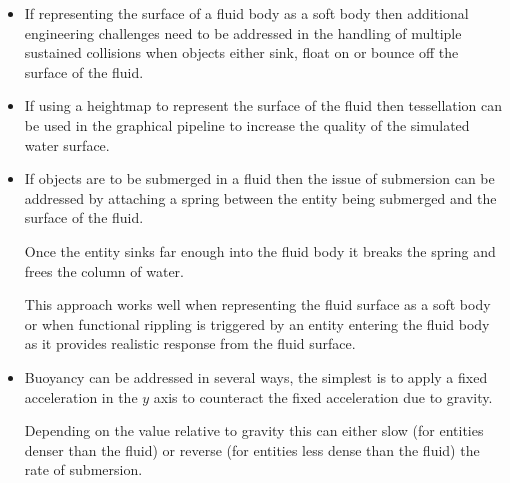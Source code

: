 \documentclass[a4paper]{article}
\begin{document}
\begin{itemize}
  \item
    If representing the surface of a fluid body as a soft body then additional
    engineering challenges need to be addressed in the handling of multiple
    sustained collisions when objects either sink, float on or bounce off the
    surface of the fluid.

  \item
    If using a heightmap to represent the surface of the fluid then tessellation
    can be used in the graphical pipeline to increase the quality of the
    simulated water surface.

  \item
    If objects are to be submerged in a fluid then the issue of submersion can
    be addressed by attaching a spring between the entity being submerged and
    the surface of the fluid.

    Once the entity sinks far enough into the fluid body it breaks the spring
    and frees the column of water.

    This approach works well when representing the fluid surface as a soft body
    or when functional rippling is triggered by an entity entering the fluid
    body as it provides realistic response from the fluid surface.

  \item
    Buoyancy can be addressed in several ways, the simplest is to apply a fixed
    acceleration in the $y$ axis to counteract the fixed acceleration due to
    gravity.

    Depending on the value relative to gravity this can either slow (for
    entities denser than the fluid) or reverse (for entities less dense than the
    fluid) the rate of submersion.

\end{itemize}
\end{document}
